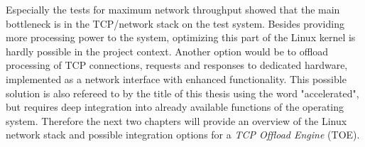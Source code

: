 Especially the tests for maximum network throughput showed that the main bottleneck is in the TCP/network stack on the test system. Besides providing more processing power to the system, optimizing this part of the Linux kernel is hardly possible in the project context. Another option would be to offload processing of TCP connections, requests and responses to dedicated hardware, implemented as a network interface with enhanced functionality. This possible solution is also refereed to by the title of this thesis using the word "accelerated", but requires deep integration into already available functions of the operating system. Therefore the next two chapters will provide an overview of the Linux network stack and possible integration options for a \textit{TCP Offload Engine} (TOE).